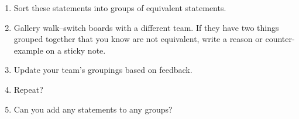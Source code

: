 \documentclass{article}
\begin{document}
\begin{app}
\begin{enumerate}[1)]
\item Sort these statements into groups of equivalent statements.
\item Gallery walk--switch boards with a different team.  If they have two things grouped together that you know are not equivalent, write a reason or counter-example on a sticky note.
\item Update your team's groupings based on feedback.
\item Repeat?
\item Can you add any statements to any groups?
\end{enumerate}
\end{app}
\end{document}
